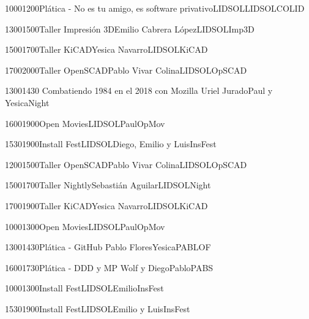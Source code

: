 \documentclass[a4paper,10pt]{report}
\begin{document}
\begin{landscape}
\begin{timetable}

 
   
  
   
   
   {1000}{1200}{Pl\'{a}tica - No es tu amigo, es software privativo}{LIDSOL}{{\tiny LIDSOL}}{COLID}
  
    {1300}{1500}{Taller Impresi\'{o}n 3D}{Emilio Cabrera L\'{o}pez}{{\tiny LIDSOL}}{Imp3D}
  
     {1500}{1700}{Taller KiCAD}{Yesica Navarro}{{\tiny LIDSOL}}{KiCAD}
    
     {1700}{2000}{Taller OpenSCAD}{Pablo Vivar Colina}{{\tiny LIDSOL}}{OpSCAD}
    
    
    {1300}{1430}{ Combatiendo 1984 en el 2018 con Mozilla }{Uriel Jurado}{{\tiny Paul y Yesica}}{Night}
 
  
   {1600}{1900}{Open Movies}{LIDSOL}{{\tiny Paul}}{OpMov}
   
   
    {1530}{1900}{Install Fest}{LIDSOL}{{\tiny Diego, Emilio y Luis}}{InsFest}
   
  
  
  
   
    {1200}{1500}{Taller OpenSCAD}{Pablo Vivar Colina}{{\tiny LIDSOL}}{OpSCAD}
   
     {1500}{1700}{Taller Nightly}{Sebasti\'{a}n Aguilar}{{\tiny LIDSOL}}{Night}
    
     {1700}{1900}{Taller KiCAD}{Yesica Navarro}{{\tiny LIDSOL}}{KiCAD}
    
    
 {1000}{1300}{Open Movies}{LIDSOL}{{\tiny Paul}}{OpMov}
    
     {1300}{1430}{Pl\'{a}tica - GitHub }{Pablo Flores}{{\tiny Yesica}}{PABLOF}
   
   
    {1600}{1730}{Pl\'{a}tica - DDD y MP }{Wolf y Diego}{{\tiny Pablo}}{PABS}
 
 
  {1000}{1300}{Install Fest}{LIDSOL}{{\tiny Emilio}}{InsFest}
   
    {1530}{1900}{Install Fest}{LIDSOL}{{\tiny Emilio y Luis}}{InsFest}
   
   
   
   
 \end{timetable}
 
 
 
 \end{landscape}
 

 
\end{document}
